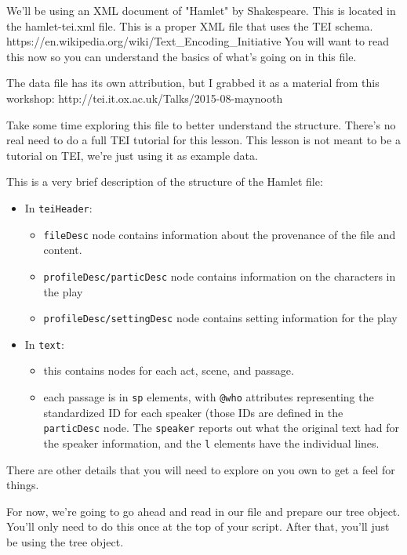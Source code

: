 \documentclass[11pt]{article}
\providecommand{\tightlist}{%
      \setlength{\itemsep}{0pt}\setlength{\parskip}{0pt}}
\begin{document}
We'll be using an XML document of "Hamlet" by Shakespeare. This is
located in the hamlet-tei.xml file. This is a proper XML file that uses
the TEI schema. https://en.wikipedia.org/wiki/Text\_Encoding\_Initiative
You will want to read this now so you can understand the basics of
what's going on in this file.

The data file has its own attribution, but I grabbed it as a material
from this workshop: http://tei.it.ox.ac.uk/Talks/2015-08-maynooth

Take some time exploring this file to better understand the structure.
There's no real need to do a full TEI tutorial for this lesson. This
lesson is not meant to be a tutorial on TEI, we're just using it as
example data.

This is a very brief description of the structure of the Hamlet file:

\begin{itemize}
\tightlist
\item
  In \texttt{teiHeader}:

  \begin{itemize}
  \tightlist
  \item
    \texttt{fileDesc} node contains information about the provenance of
    the file and content.
  \item
    \texttt{profileDesc/particDesc} node contains information on the
    characters in the play
  \item
    \texttt{profileDesc/settingDesc} node contains setting information
    for the play
  \end{itemize}
\item
  In \texttt{text}:

  \begin{itemize}
  \tightlist
  \item
    this contains nodes for each act, scene, and passage.
  \item
    each passage is in \texttt{sp} elements, with \texttt{@who}
    attributes representing the standardized ID for each speaker (those
    IDs are defined in the \texttt{particDesc} node. The
    \texttt{speaker} reports out what the original text had for the
    speaker information, and the \texttt{l} elements have the individual
    lines.
  \end{itemize}
\end{itemize}

There are other details that you will need to explore on you own to get
a feel for things.

For now, we're going to go ahead and read in our file and prepare our
tree object. You'll only need to do this once at the top of your script.
After that, you'll just be using the tree object.
\end{document}
